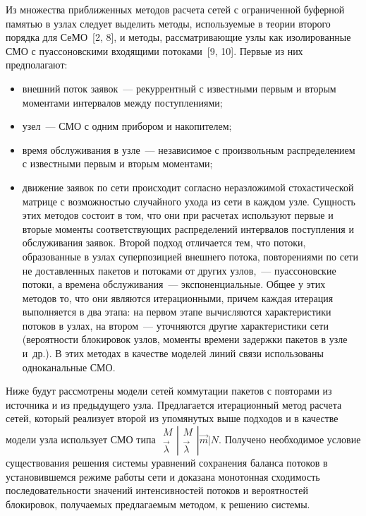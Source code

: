\begin{multicols}{2}
     Из множества приближенных методов расчета сетей с ограниченной 
буферной памятью в узлах следует выделить методы, используемые в теории 
второго порядка для СеМО~[2, 8], и методы, рассматривающие узлы как 
изолированные СМО с пуассоновскими входящими потоками~[9, 10]. Первые 
из них предполагают: 
     \begin{itemize}
         \item внешний поток заявок~--- рекуррентный с известными первым и 
вторым моментами интервалов между поступлениями; 
     \item  узел~--- СМО с одним прибором и накопителем;
     \item  время обслуживания в узле~--- независимое с произвольным 
распределением с известными первым и вторым моментами;
     \item движение заявок по сети происходит согласно неразложимой 
стохастической матрице с возможностью случайного ухода из сети в каж\-дом 
узле. Сущность этих методов состоит в том, что они при расчетах используют 
первые и вторые моменты соответствующих распределений интервалов 
поступления и обслуживания заявок. Второй подход отличается тем, что 
потоки, образованные в узлах суперпозицией внешнего потока, повторениями 
по сети не доставленных пакетов и потоками от других узлов,~--- 
пуассоновские потоки, а времена обслуживания~--- экспоненциальные. Общее 
у этих методов то, что они являются итерационными, причем каж\-дая итерация 
выполняется в два этапа: на первом этапе вычисляются характеристики потоков 
в узлах, на втором~--- уточняются другие характеристики сети (вероятности 
блокировок узлов, моменты времени задержки пакетов в узле и~др.). В этих 
методах в качестве моделей линий связи использованы одноканальные СМО. 
     \end{itemize}
     
     Ниже будут рассмотрены модели сетей коммутации пакетов с повторами 
из источника и из предыду\-ще\-го узла. Предлагается итерационный метод 
расчета сетей, который реализует второй из упомянутых выше подходов и в 
качестве модели узла использует СМО типа $
      \begin{matrix}
      M \\ \vec{\lambda}
      \end{matrix}
      \left |
      \begin{matrix}
      M \\ \vec{\lambda}
      \end{matrix}
      \right |
      \vec{m} \vert N$. Получено необходимое условие существования решения 
системы уравнений сохранения баланса потоков в установившемся режиме 
работы сети и доказана монотонная сходимость последовательности значений 
интенсивностей потоков и вероятностей блокировок, получаемых 
предлагаемым методом, к решению системы.
     

\end{multicols}
